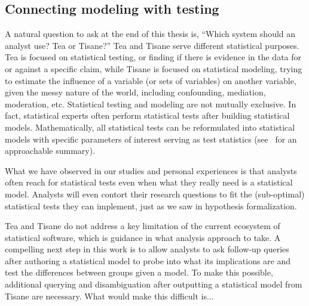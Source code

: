 \subsection{Connecting modeling with testing} 
A natural question to ask at the end of this thesis is, ``Which system should an
analyst use? Tea or Tisane?'' Tea and Tisane serve different statistical
purposes. Tea is focused on statistical testing, or finding if there is evidence
in the data for or against a specific claim, while Tisane is focused on
statistical modeling, trying to estimate the influence of a variable (or sets of
variables) on another variable, given the messy nature of the world, including
confounding, mediation, moderation, etc. Statistical testing and modeling are
not mutually exclusive. In fact, statistical experts often perform statistical
tests after building statistical models. Mathematically, all statistical tests
can be reformulated into statistical models with specific parameters of interest
serving as test statistics (see~\cite{} for an approachable summary). 

What we have observed in our studies and personal experiences is that analysts
often reach for statistical tests even when what they really need is a
statistical model. Analysts will even contort their research questions to fit
the (sub-optimal) statistical tests they can implement, just as we saw in
hypothesis formalization. 

Tea and Tisane do not address a key limitation of the current ecosystem of
statistical software, which is guidance in what analysis approach to take. A
compelling next step in this work is to allow analysts to ask follow-up queries
after authoring a statistical model to probe into what its implications are and
test the differences between groups given a model. To make this possible,
additional querying and disambiguation after outputting a statistical model from
Tisane are necessary. What would make this difficult is...

